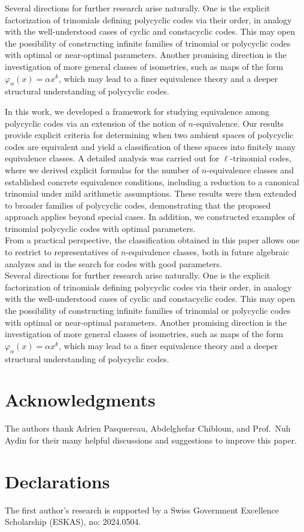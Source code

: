 \documentclass[12pt]{elsarticle}
\theoremstyle{break}
{\theorembodyfont{\upshape}
    \newtheorem{theorem}{Theorem}[section] %
    \newtheorem{lemma}[theorem]{Lemma} %
    \newtheorem{proposition}[theorem]{Proposition}
    \newtheorem{corollary}[theorem]{Corollary}
    \newtheorem{definition}[theorem]{Definition}
    \newtheorem{example}[theorem]{Example}
    \newtheorem{remark}[theorem]{Remark}
    \newtheorem{conjecture}[theorem]{Conjecture}
    \newtheorem*{proof}{{Proof}}
	\newtheorem*{notation}{Notation}
	\newtheorem*{main}{Cain Theorem}
	\newtheorem*{problem}{Problem}
}
\begin{document}
Several directions for further research arise naturally. One is the explicit factorization of trinomials defining polycyclic codes via their order, in analogy with the well-understood cases of cyclic and constacyclic codes. This may open the possibility of constructing infinite families of trinomial or polycyclic codes with optimal or near-optimal parameters. Another promising direction is the investigation of more general classes of isometries, such as maps of the form $\varphi_{\alpha}(x)=\alpha x^{k}$, which may lead to a finer equivalence theory and a deeper structural understanding of polycyclic codes.



In this work, we developed a framework for studying equivalence among polycyclic codes via an extension of the notion of $n$-equivalence. Our results provide explicit criteria for determining when two ambient spaces of polycyclic codes are equivalent and yield a classification of these spaces into finitely many equivalence classes.
A detailed analysis was carried out for $\ell$-trinomial codes, where we derived explicit formulas for the number of $n$-equivalence classes and established concrete equivalence conditions, including a reduction to a canonical trinomial under mild arithmetic assumptions. These results were then extended to broader families of polycyclic codes, demonstrating that the proposed approach applies beyond special cases. In addition, we constructed examples of trinomial polycyclic codes with optimal parameters.\\
From a practical perspective, the classification obtained in this paper allows one to restrict  to representatives of $n$-equivalence classes, both in future algebraic analyzes and in the search for codes with good parameters.\\
Several directions for further research arise naturally. One is the explicit factorization of trinomials defining polycyclic codes via their order, in analogy with the well-understood cases of cyclic and constacyclic codes. This may open the possibility of constructing infinite families of trinomial or polycyclic codes with optimal or near-optimal parameters. Another promising direction is the investigation of more general classes of isometries, such as maps of the form $\varphi_{\alpha}(x)=\alpha x^{k}$, which may lead to a finer equivalence theory and a deeper structural understanding of polycyclic codes.







\section*{Acknowledgments}
The authors thank Adrien Pasquereau, Abdelghefar Chibloun, and Prof.\ Nuh Aydin for their many helpful discussions and suggestions to improve this paper.

\section*{Declarations}
The first author’s research is supported by a Swiss Government Excellence Scholarship (ESKAS), no:  2024.0504.
 

\end{document}
